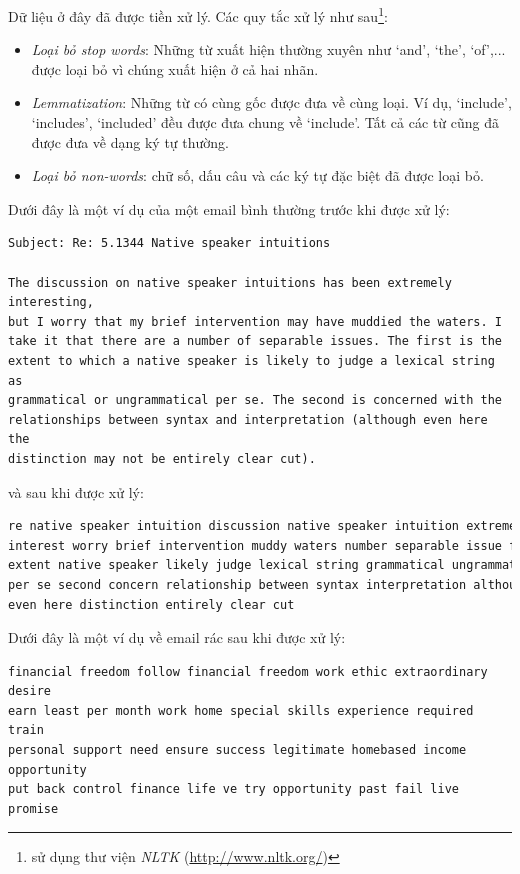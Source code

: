 Dữ liệu ở đây đã được tiền xử lý. Các quy tắc xử lý như sau\footnote{sử dụng thư viện \textit{NLTK}
(\url{http://www.nltk.org/})}:
\begin{itemize}
    \item \textit{Loại bỏ \textit{stop words}}: Những từ xuất hiện thường xuyên như `and', `the', `of',... được loại bỏ vì chúng xuất hiện ở cả hai nhãn.

    \item \textit{Lemmatization}: Những từ có cùng gốc được đưa về cùng loại. Ví dụ, `include', `includes', `included' đều được đưa chung về `include'. Tất cả các từ cũng đã được đưa về dạng ký tự thường.
 
    
    \item \textit{Loại bỏ \textit{non-words}}: chữ số, dấu câu và các ký tự đặc biệt đã được loại bỏ.  
\end{itemize}


 
Dưới đây là một ví dụ của một email bình thường {trước khi được xử lý}:
 
\begin{lstlisting}
Subject: Re: 5.1344 Native speaker intuitions 
   
The discussion on native speaker intuitions has been extremely interesting, 
but I worry that my brief intervention may have muddied the waters. I 
take it that there are a number of separable issues. The first is the 
extent to which a native speaker is likely to judge a lexical string as 
grammatical or ungrammatical per se. The second is concerned with the 
relationships between syntax and interpretation (although even here the 
distinction may not be entirely clear cut). \end{lstlisting}
 
\newpage 
và {sau khi được xử lý}:
 
\begin{lstlisting}[language=Python]
re native speaker intuition discussion native speaker intuition extremely  
interest worry brief intervention muddy waters number separable issue first  
extent native speaker likely judge lexical string grammatical ungrammatical  
per se second concern relationship between syntax interpretation although  
even here distinction entirely clear cut  
\end{lstlisting}
 
Dưới đây là một ví dụ về {email rác sau khi được xử lý}:
 
\begin{lstlisting}
financial freedom follow financial freedom work ethic extraordinary desire 
earn least per month work home special skills experience required train 
personal support need ensure success legitimate homebased income opportunity 
put back control finance life ve try opportunity past fail live promise
\end{lstlisting}
 
